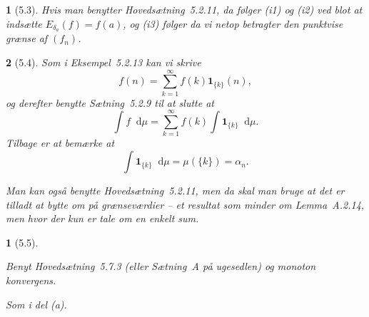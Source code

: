 \documentclass[a4paper, 11pt, article, danish, oneside]{memoir}
\newcommand{\dif}{\mathop{}\!\mathrm{d}}
\newcommand{\indicator}[1]{\mathbf{1}_{#1}}
\newcommand{\pencilsymbol}{\raisebox{-2pt}{\normalfont\PencilLeft}}
\theoremstyle{changedotcustomnumber}
\newtheorem{opgave}{\pencilsymbol}
\theoremstyle{changedotbreakcustomnumber}
\newtheorem{opgavebreak}{\pencilsymbol}
\begin{document}
\begin{opgave}[5.3]
    Hvis man benytter Hovedsætning~5.2.11, da følger (i1) og (i2) ved blot at indsætte $E_{\delta_a}(f) = f(a)$, og (i3) følger da vi netop betragter den punktvise grænse af $(f_n)$.
\end{opgave}


\begin{opgave}[5.4]
    Som i Eksempel~5.2.13 kan vi skrive
    \begin{equation*}
        f(n)
            = \sum_{k=1}^\infty f(k) \indicator{\{k\}}(n),
    \end{equation*}
    og derefter benytte Sætning~5.2.9 til at slutte at
    \begin{equation*}
        \int f \dif\mu
            = \sum_{k=1}^\infty f(k) \int \indicator{\{k\}} \dif\mu.
    \end{equation*}
    Tilbage er at bemærke at
    \begin{equation*}
        \int \indicator{\{k\}} \dif\mu
            = \mu(\{k\})
            = \alpha_n.
    \end{equation*}

    Man kan også benytte Hovedsætning~5.2.11, men da skal man bruge at det er tilladt at bytte om på grænseværdier -- et resultat som minder om Lemma~A.2.14, men hvor der kun er tale om en enkelt sum.
\end{opgave}


\begin{opgavebreak}[5.5]
\begin{solutionsec}
    \item Benyt Hovedsætning~5.7.3 (eller Sætning~A på ugesedlen) og monoton konvergens.

    \item Som i del (a).
\end{solutionsec}
\end{opgavebreak}
\end{document}
